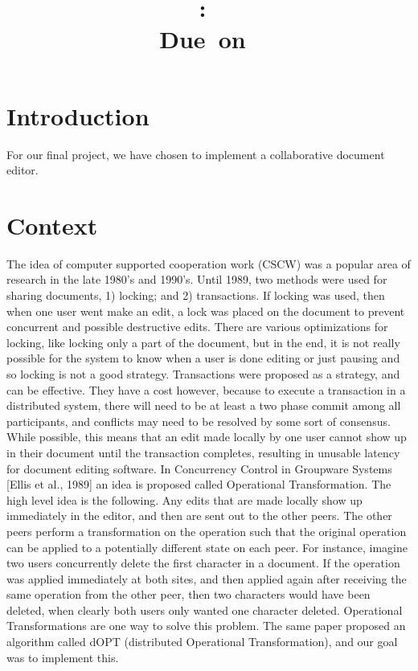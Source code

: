 \documentclass{article}
\title{
    \vspace{2in}
    \textmd{\textbf{\hmwkClass:\ \hmwkTitle}}\\
    \normalsize\vspace{0.1in}\small{Due\ on\ \hmwkDueDate}\\
    \vspace{0.1in}\large{\textit{\hmwkClassInstructor}}
}
\author{\hmwkAuthorName}
\date{}
\begin{document}
\maketitle

\pagebreak

\section{Introduction}
For our final project, we have chosen to implement a collaborative document editor.

\section{Context}
The idea of computer supported cooperation work (CSCW) was a popular area of research in the late 1980's and 1990's. Until 1989, two methods were used for sharing documents, 1) locking; and 2) transactions. If locking was used, then when one user went make an edit, a lock was placed on the document to prevent concurrent and possible destructive edits. There are various optimizations for locking, like locking only a part of the document, but in the end, it is not really possible for the system to know when a user is done editing or just pausing and so locking is not a good strategy. Transactions were proposed as a strategy, and can be effective. They have a cost however, because to execute a transaction in a distributed system, there will need to be at least a two phase commit among all participants, and conflicts may need to be resolved by some sort of consensus. While possible, this means that an edit made locally by one user cannot show up in their document until the transaction completes, resulting in unusable latency for document editing software. In Concurrency Control in Groupware Systems [Ellis et al., 1989] an idea is proposed called Operational Transformation. The high level idea is the following. Any edits that are made locally show up immediately in the editor, and then are sent out to the other peers. The other peers perform a transformation on the operation such that the original operation can be applied to a potentially different state on each peer. For instance, imagine two users concurrently delete the first character in a document. If the operation was applied immediately at both sites, and then applied again after receiving the same operation from the other peer, then two characters would have been deleted, when clearly both users only wanted one character deleted. Operational Transformations are one way to solve this problem. The same paper proposed an algorithm called dOPT (distributed Operational Transformation), and our goal was to implement this.
\end{document}
